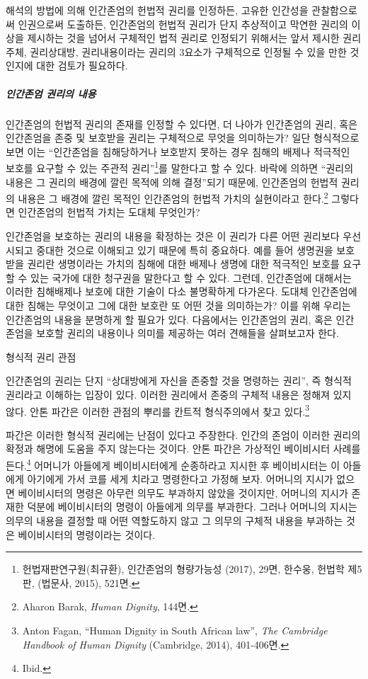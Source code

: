 해석의 방법에 의해 인간존엄의 헌법적 권리를 인정하든, 고유한 인간성을 관찰함으로써 인권으로써 도출하든, 인간존엄의 헌법적 권리가 단지 추상적이고 막연한 권리의 이상을 제시하는 것을 넘어서 구체적인 법적 권리로 인정되기 위해서는 앞서 제시한 권리주체, 권리상대방, 권리내용이라는 권리의 3요소가 구체적으로 인정될 수 있을 만한 것인지에 대한 검토가 필요하다.

\subparagraph{인간존엄 권리의 내용}

인간존엄의 헌법적 권리의 존재를 인정할 수 있다면, 더 나아가 인간존엄의 권리, 혹은 인간존엄을 존중 및 보호받을 권리는 구체적으로 무엇을 의미하는가? 일단 형식적으로 보면 이는 ``인간존엄을 침해당하거나 보호받지 못하는 경우 침해의 배제나 적극적인 보호를 요구할 수 있는 주관적 권리''\footnote{헌법재판연구원(최규환), 인간존엄의 형량가능성 (2017), 29면, 한수웅, 헌법학 제5판, (법문사, 2015), 521면.}를 말한다고 할 수 있다. 바락에 의하면 ``권리의 내용은 그 권리의 배경에 깔린 목적에 의해 결정''되기 때문에, 인간존엄의 헌법적 권리의 내용은 그 배경에 깔린 목적인 인간존엄의 헌법적 가치의 실현이라고 한다.\footnote{Aharon Barak, \emph{Human Dignity}, 144면.} 그렇다면 인간존엄의 헌법적 가치는 도대체 무엇인가?

인간존엄을 보호하는 권리의 내용을 확정하는 것은 이 권리가 다른 어떤 권리보다 우선시되고 중대한 것으로 이해되고 있기 때문에 특히 중요하다. 예를 들어 생명권을 보호받을 권리란 생명이라는 가치의 침해에 대한 배제나 생명에 대한 적극적인 보호를 요구할 수 있는 국가에 대한 청구권을 말한다고 할 수 있다. 그런데, 인간존엄에 대해서는 이러한 침해배제나 보호에 대한 기술이 다소 불명확하게 다가온다. 도대체 인간존엄에 대한 침해는 무엇이고 그에 대한 보호란 또 어떤 것을 의미하는가? 이를 위해 우리는 인간존엄의 내용을 분명하게 할 필요가 있다. 다음에서는 인간존엄의 권리, 혹은 인간존엄을 보호할 권리의 내용이나 의미를 제공하는 여러 견해들을 살펴보고자 한다.

형식적 권리 관점

인간존엄의 권리는 단지 ``상대방에게 자신을 존중할 것을 명령하는 권리'', 즉 형식적 권리라고 이해하는 입장이 있다. 이러한 권리에서 존중의 구체적 내용은 정해져 있지 않다. 안톤 파간은 이러한 관점의 뿌리를 칸트적 형식주의에서 찾고 있다.\footnote{Anton Fagan, ``Human Dignity in South African law'', \emph{The Cambridge Handbook of Human Dignity} (Cambridge, 2014), 401-406면.}

파간은 이러한 형식적 권리에는 난점이 있다고 주장한다. 인간의 존엄이 이러한 권리의 확정과 해명에 도움을 주지 않는다는 것이다. 안톤 파간은 가상적인 베이비시터 사례를 든다.\footnote{Ibid.} 어머니가 아들에게 베이비시터에게 순종하라고 지시한 후 베이비시터는 이 아들에게 아기에게 가서 코를 세게 치라고 명령한다고 가정해 보자. 어머니의 지시가 없으면 베이비시터의 명령은 아무런 의무도 부과하지 않았을 것이지만, 어머니의 지시가 존재한 덕분에 베이비시터의 명령이 아들에게 의무를 부과한다. 그러나 어머니의 지시는 의무의 내용을 결정할 때 어떤 역할도하지 않고 그 의무의 구체적 내용을 부과하는 것은 베이비시터의 명령이라는 것이다.

